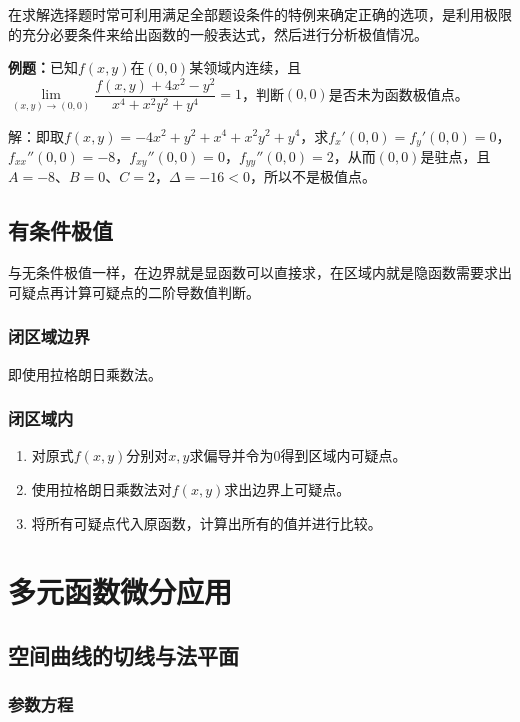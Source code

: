 \documentclass[UTF8, 12pt]{ctexart}
\begin{document}
在求解选择题时常可利用满足全部题设条件的特例来确定正确的选项，是利用极限的充分必要条件来给出函数的一般表达式，然后进行分析极值情况。

\textbf{例题：}已知$f(x,y)$在$(0,0)$某领域内连续，且$\lim\limits_{(x,y)\to(0,0)}\dfrac{f(x,y)+4x^2-y^2}{x^4+x^2y^2+y^4}=1$，判断$(0,0)$是否未为函数极值点。

解：即取$f(x,y)=-4x^2+y^2+x^4+x^2y^2+y^4$，求$f_x'(0,0)=f_y'(0,0)=0$，$f_{xx}''(0,0)=-8$，$f_{xy}''(0,0)=0$，$f_{yy}''(0,0)=2$，从而$(0,0)$是驻点，且$A=-8$、$B=0$、$C=2$，$\Delta=-16<0$，所以不是极值点。

\subsection{有条件极值}

与无条件极值一样，在边界就是显函数可以直接求，在区域内就是隐函数需要求出可疑点再计算可疑点的二阶导数值判断。

\subsubsection{闭区域边界}

即使用拉格朗日乘数法。

\subsubsection{闭区域内}

\begin{enumerate}
    \item 对原式$f(x,y)$分别对$x,y$求偏导并令为0得到区域内可疑点。
    \item 使用拉格朗日乘数法对$f(x,y)$求出边界上可疑点。
    \item 将所有可疑点代入原函数，计算出所有的值并进行比较。
\end{enumerate}

\section{多元函数微分应用}

\subsection{空间曲线的切线与法平面}

\subsubsection{参数方程}
\end{document}
